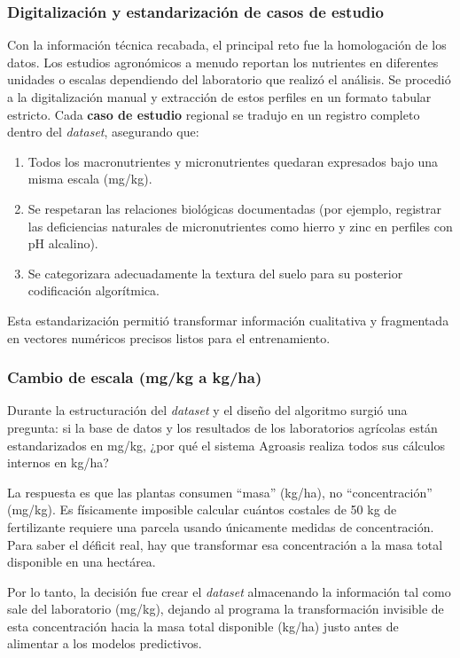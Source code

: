 \documentclass[12pt]{article}
\begin{document}
\subsubsection*{Digitalización y estandarización de casos de estudio}
Con la información técnica recabada, el principal reto fue la homologación de los datos. Los estudios agronómicos a menudo reportan los nutrientes en diferentes unidades o escalas dependiendo del laboratorio que realizó el análisis. Se procedió a la digitalización manual y extracción de estos perfiles en un formato tabular estricto. Cada \textbf{caso de estudio} regional se tradujo en un registro completo dentro del \textit{dataset}, asegurando que:

\begin{enumerate}
    \item Todos los macronutrientes y micronutrientes quedaran expresados bajo una misma escala (mg/kg).
    \item Se respetaran las relaciones biológicas documentadas (por ejemplo, registrar las deficiencias naturales de micronutrientes como hierro y zinc en perfiles con pH alcalino).
    \item Se categorizara adecuadamente la textura del suelo para su posterior codificación algorítmica.
\end{enumerate}

Esta estandarización permitió transformar información cualitativa y fragmentada en vectores numéricos precisos listos para el entrenamiento.

\subsubsection{Cambio de escala (mg/kg a kg/ha)}
Durante la estructuración del \textit{dataset} y el diseño del algoritmo surgió una pregunta: si la base de datos y los resultados de los laboratorios agrícolas están estandarizados en mg/kg, ¿por qué el sistema Agroasis realiza todos sus cálculos internos en kg/ha?

La respuesta es que las plantas consumen ``masa'' (kg/ha), no ``concentración'' (mg/kg). Es físicamente imposible calcular cuántos costales de 50 kg de fertilizante requiere una parcela usando únicamente medidas de concentración. Para saber el déficit real, hay que transformar esa concentración a la masa total disponible en una hectárea.

Por lo tanto, la decisión fue crear el \textit{dataset} almacenando la información tal como sale del laboratorio (mg/kg), dejando al programa la transformación invisible de esta concentración hacia la masa total disponible (kg/ha) justo antes de alimentar a los modelos predictivos.
\end{document}
